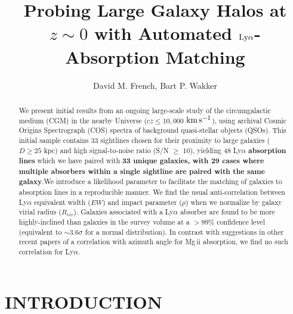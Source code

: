 \documentclass[twocolumn,tighten]{aastex6}
\begin{document}
\title{Probing Large Galaxy Halos at $z\sim0$ with Automated $\rm L \MakeLowercase{y} \alpha$-Absorption Matching}

\author{David M. French, Bart P. Wakker}


\begin{abstract}

We present initial results from an ongoing large-scale study of the circumgalactic medium (CGM) in the nearby Universe ($cz \leq 10,000$ $\rm km\, s^{-1}$), using archival Cosmic Origins Spectrograph (COS) spectra of background quasi-stellar objects (QSOs). This initial sample contains 33 sightlines chosen for their proximity to large galaxies ($D\geq25$ kpc) and high signal-to-noise ratio (S/N $\geq$ 10), yielding 48 Ly$\alpha$ \textbf{absorption lines} which we have paired with \textbf{33 unique galaxies, with 29 cases where multiple absorbers within a single sightline are paired with the same galaxy}.We introduce a likelihood parameter to facilitate the matching of galaxies to absorption lines in a reproducible manner. We find the usual anti-correlation between Ly$\alpha$ equivalent width ($EW$) and impact parameter ($\rho$) when we normalize by galaxy virial radius ($R_{vir}$). Galaxies associated with a Ly$\alpha$ absorber are found to be more highly-inclined than galaxies in the survey volume at a $>99\%$ confidence level (equivalent to $\sim 3.6 \sigma$ for a normal distribution). In contrast with suggestions in other recent papers of a correlation with azimuth angle for Mg\,{\sc ii} absorption, we find no such correlation for Ly$\alpha$.

\end{abstract}




\section{INTRODUCTION}
\end{document}
